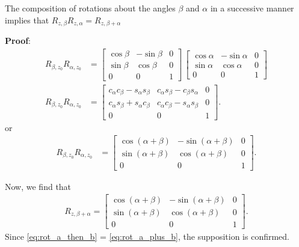 \begin{solution}
	The composition of rotations about the angles $\beta$ and $\alpha$ in a successive manner implies that $R_{z, \beta}  R_{z, \alpha} = R_{z, \beta + \alpha}$
	
	\noindent \textbf{Proof}: 
	\begin{align}
		R_{\beta, z_0} R_{\alpha, z_0}  &= \begin{bmatrix}
		\cos \beta & -\sin \beta    &  0  \\
		\sin \beta    &  \cos \beta   &  0 \\
		0 &  0  &  1 
		\end{bmatrix} \, \begin{bmatrix}
		\cos \alpha & -\sin \alpha    &  0  \\
		\sin \alpha    &  \cos \alpha   &  0 \\
		0 &  0  &  1 
		\end{bmatrix} \\ 
	R_{\beta, z_0} R_{\alpha, z_0}	&= \begin{bmatrix}
		c_\alpha c_\beta -s_\alpha s_\beta & c_\alpha s_\beta -c_\beta s_\alpha    &  0  \\
		c_\alpha s_\beta + s_\alpha c_\beta    &  c_\alpha c_\beta - s_\alpha s_\beta  &  0 \\
		0 & 0 & 1
		\end{bmatrix} .
	\end{align}
	or 
	\begin{align}
	R_{\beta, z_0} R_{\alpha, z_0}	&= \begin{bmatrix}
		\cos(\alpha + \beta) & -\sin(\alpha + \beta)    &  0  \\
		\sin(\alpha + \beta)     &  \cos(\alpha + \beta)  &  0 \\
		0 & 0 & 1
	\end{bmatrix} .
	\label{eq:rot_a_then_b}
\end{align}

Now, we find that 
%
\begin{align}
	R_{z, \beta + \alpha} = \begin{bmatrix}
	\cos(\alpha + \beta) & -\sin(\alpha + \beta)    &  0  \\
	\sin(\alpha + \beta)     &  \cos(\alpha + \beta)  &  0 \\
	0 & 0 & 1
	\end{bmatrix}.
	\label{eq:rot_a_plus_b}
\end{align}
%
Since \eqref{eq:rot_a_then_b} = \eqref{eq:rot_a_plus_b}, the supposition is confirmed.


\end{solution}
